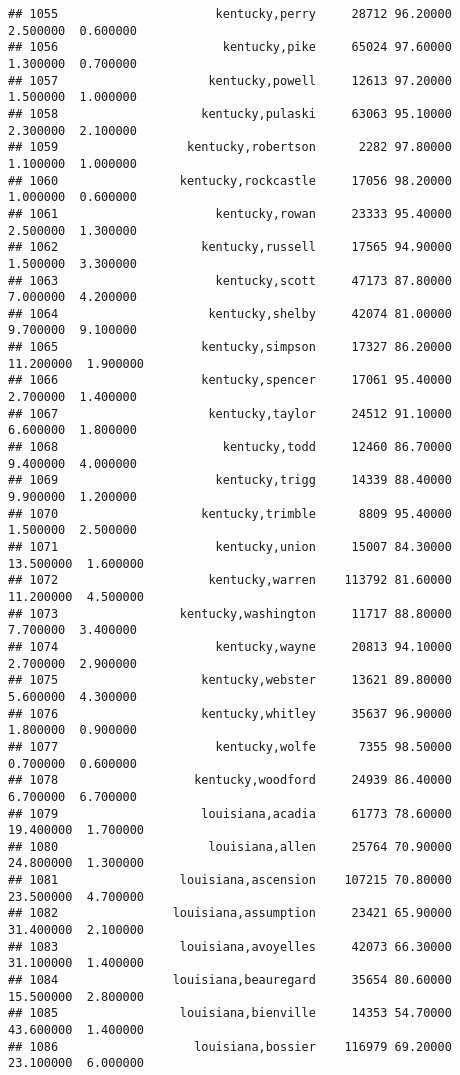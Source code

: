 \documentclass[
]{article}
\begin{document}
\begin{verbatim}
## 1055                      kentucky,perry     28712 96.20000  2.500000  0.600000
## 1056                       kentucky,pike     65024 97.60000  1.300000  0.700000
## 1057                     kentucky,powell     12613 97.20000  1.500000  1.000000
## 1058                    kentucky,pulaski     63063 95.10000  2.300000  2.100000
## 1059                  kentucky,robertson      2282 97.80000  1.100000  1.000000
## 1060                 kentucky,rockcastle     17056 98.20000  1.000000  0.600000
## 1061                      kentucky,rowan     23333 95.40000  2.500000  1.300000
## 1062                    kentucky,russell     17565 94.90000  1.500000  3.300000
## 1063                      kentucky,scott     47173 87.80000  7.000000  4.200000
## 1064                     kentucky,shelby     42074 81.00000  9.700000  9.100000
## 1065                    kentucky,simpson     17327 86.20000 11.200000  1.900000
## 1066                    kentucky,spencer     17061 95.40000  2.700000  1.400000
## 1067                     kentucky,taylor     24512 91.10000  6.600000  1.800000
## 1068                       kentucky,todd     12460 86.70000  9.400000  4.000000
## 1069                      kentucky,trigg     14339 88.40000  9.900000  1.200000
## 1070                    kentucky,trimble      8809 95.40000  1.500000  2.500000
## 1071                      kentucky,union     15007 84.30000 13.500000  1.600000
## 1072                     kentucky,warren    113792 81.60000 11.200000  4.500000
## 1073                 kentucky,washington     11717 88.80000  7.700000  3.400000
## 1074                      kentucky,wayne     20813 94.10000  2.700000  2.900000
## 1075                    kentucky,webster     13621 89.80000  5.600000  4.300000
## 1076                    kentucky,whitley     35637 96.90000  1.800000  0.900000
## 1077                      kentucky,wolfe      7355 98.50000  0.700000  0.600000
## 1078                   kentucky,woodford     24939 86.40000  6.700000  6.700000
## 1079                    louisiana,acadia     61773 78.60000 19.400000  1.700000
## 1080                     louisiana,allen     25764 70.90000 24.800000  1.300000
## 1081                 louisiana,ascension    107215 70.80000 23.500000  4.700000
## 1082                louisiana,assumption     23421 65.90000 31.400000  2.100000
## 1083                 louisiana,avoyelles     42073 66.30000 31.100000  1.400000
## 1084                louisiana,beauregard     35654 80.60000 15.500000  2.800000
## 1085                 louisiana,bienville     14353 54.70000 43.600000  1.400000
## 1086                   louisiana,bossier    116979 69.20000 23.100000  6.000000

\end{verbatim}
\end{document}
